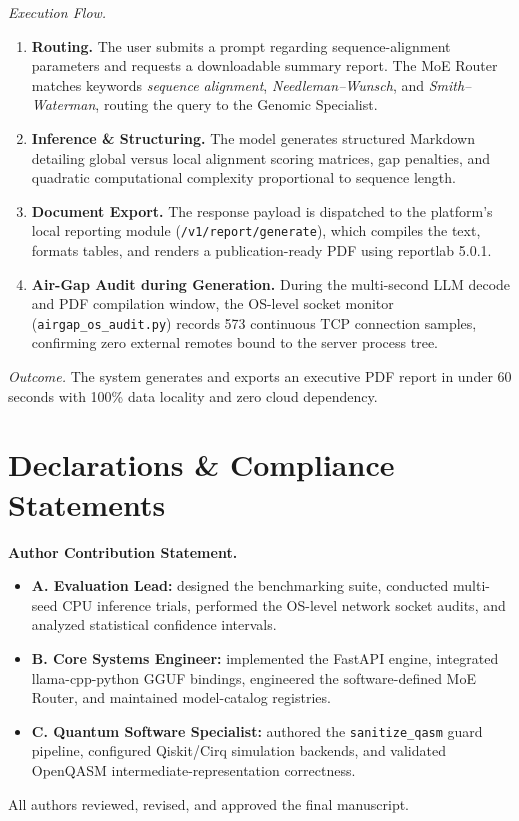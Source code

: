 \documentclass[journal]{IEEEtran}
\begin{document}
\textit{Execution Flow.}
\begin{enumerate}
\item \textbf{Routing.} The user submits a prompt regarding sequence-alignment
parameters and requests a downloadable summary report. The MoE Router matches
keywords \emph{sequence alignment}, \emph{Needleman--Wunsch}, and
\emph{Smith--Waterman}, routing the query to the Genomic Specialist.
\item \textbf{Inference \& Structuring.} The model generates structured Markdown
detailing global versus local alignment scoring matrices, gap penalties, and
quadratic computational complexity proportional to sequence length.
\item \textbf{Document Export.} The response payload is dispatched to the
platform's local reporting module (\texttt{/v1/report/generate}), which compiles
the text, formats tables, and renders a publication-ready PDF using reportlab
5.0.1.
\item \textbf{Air-Gap Audit during Generation.} During the multi-second LLM
decode and PDF compilation window, the OS-level socket monitor
(\texttt{airgap\_os\_audit.py}) records 573 continuous TCP connection samples,
confirming zero external remotes bound to the server process tree.
\end{enumerate}

\textit{Outcome.} The system generates and exports an executive PDF report in
under 60 seconds with 100\% data locality and zero cloud dependency.

\section*{Declarations \& Compliance Statements}
\textbf{Author Contribution Statement.}
\begin{itemize}
\item \textbf{A. Evaluation Lead:} designed the benchmarking suite, conducted
multi-seed CPU inference trials, performed the OS-level network socket audits,
and analyzed statistical confidence intervals.
\item \textbf{B. Core Systems Engineer:} implemented the FastAPI engine,
integrated llama-cpp-python GGUF bindings, engineered the software-defined MoE
Router, and maintained model-catalog registries.
\item \textbf{C. Quantum Software Specialist:} authored the
\texttt{sanitize\_qasm} guard pipeline, configured Qiskit/Cirq simulation
backends, and validated OpenQASM intermediate-representation correctness.
\end{itemize}
All authors reviewed, revised, and approved the final manuscript.
\end{document}
